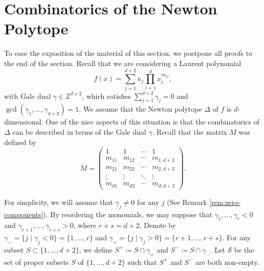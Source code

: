 \documentclass[11pt, reqno]{amsart}
\theoremstyle{plain}
\theoremstyle{definition}
\newcommand{\ga}{\gamma}
\begin{document}
\section{Combinatorics of the Newton Polytope } \label{section:combinatorics}
To ease the exposition of the material of this section, we postpone all proofs to the end of the section.  Recall that we are considering a Laurent polynomial 
\[f(x) =\sum_{j=1}^{d+2} u_j \prod_{i=1}^d x_i^{m_{ij}},\]
with Gale dual $\gamma \in \mathbb{Z}^{d+2}$, which satisfies $\sum_{j=1}^{d+2} \gamma_j=0$ and $\gcd(\ga_1,\dots,\ga_{d+2})=1$. 
We assume that the Newton polytope $\Delta$ of $f$ is $d$-dimensional. 
One of the nice aspects of this situation is that the combinatorics of $\Delta$ can be described in terms of the Gale dual $\ga$. Recall that the matrix $M$ was defined by
\begin{equation}\label{eq:matrix-M-combinatorics}
M=\begin{pmatrix}
1 & 1 &\cdots &1 \\
m_{11} & m_{12} & \cdots & m_{1,d+2} \\
m_{21} & m_{22} & \cdots & m_{2,d+2} \\
\vdots & \vdots & \ddots & \vdots \\
m_{d1} & m_{d2} & \cdots & m_{d,d+2}
\end{pmatrix}. 
\end{equation}

For simplicity, we will assume that $\ga_j \neq 0$ for any $j$ (See Remark \ref{rem:zero-components}).  By reordering the monomials, we may suppose that  $\gamma_1,\dots, \gamma_r < 0$ and $\gamma_{r+1},\dots,\gamma_{r+s} >0$, where $r+s =d+2.$ Denote by $\ga_- = \{ j \mid \ga_j <0\} =\{1, \dots,r\} $ and  $\ga_+ = \{ j \mid \ga_j >0\}  = \{r+1,\dots,r+s\}.$ 
For any subset $S \subset \{1,\dots,d+2\}$, we define $S^{+}\coloneqq S \cap \ga_{+}$ and $S^{-} \coloneqq S \cap \ga_{-}$.
Let $\mathcal{S}$ be the set of proper subsets $S$ of $\{1,\dots,d+2\}$ such that $S^+$ and $S^{-}$ are both non-empty.  
\end{document}
